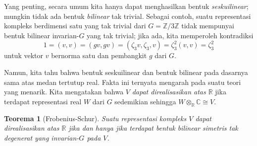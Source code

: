 \documentclass[12pt]{article}
\theoremstyle{plain}
\newtheorem{theorem}{Teorema}[section]
\theoremstyle{definition}
\theoremstyle{remark}
\numberwithin{equation}{section}
\begin{document}
Yang penting, secara umum kita hanya dapat menghasilkan bentuk \emph{seskuilinear};
mungkin tidak ada bentuk \emph{bilinear} tak trivial.
Sebagai contoh, suatu representasi kompleks berdimensi satu yang tak trivial dari
$G=\mathbb{Z}/3\mathbb{Z}$ tidak mempunyai bentuk bilinear invarian-$G$ yang tak trivial;
jika ada, kita memperoleh kontradiksi
\[
1=(v,v)=(gv,gv)=(\zeta_3v,\zeta_3,v)=\zeta_3^2(v,v)=\zeta_3^2
\]
untuk vektor $v$ bernorma satu dan pembangkit $g$ dari $G$.

Namun, kita tahu bahwa bentuk seskuilinear dan bentuk bilinear
pada dasarnya sama atas medan tertutup real.
Fakta ini ternyata mengarah pada suatu teori yang menarik. 
Kita mengatakan bahwa $V$ \emph{dapat direalisasikan atas $\mathbb{R}$} jika terdapat
representasi real $W$ dari $G$ sedemikian sehingga $W \otimes_\mathbb{R}
\mathbb{C} \cong V$.

\begin{theorem}[Frobenius-Schur] \label{thm:FrobSchur}
Suatu representasi kompleks $V$ dapat direalisasikan atas $\mathbb{R}$ jika dan hanya
jika terdapat bentuk bilinear simetris tak degenerat yang invarian-$G$
pada $V$.
\end{theorem}
\end{document}
